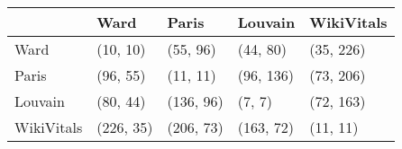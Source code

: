 \begin{tabular}{lllll}
\toprule
{} &       Ward &      Paris &    Louvain & WikiVitals \\
\midrule
Ward       &   (10, 10) &   (55, 96) &   (44, 80) &  (35, 226) \\
Paris      &   (96, 55) &   (11, 11) &  (96, 136) &  (73, 206) \\
Louvain    &   (80, 44) &  (136, 96) &     (7, 7) &  (72, 163) \\
WikiVitals &  (226, 35) &  (206, 73) &  (163, 72) &   (11, 11) \\
\bottomrule
\end{tabular}
